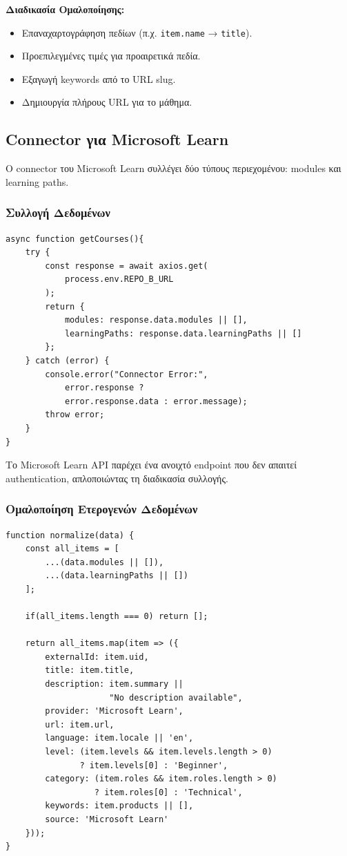 \documentclass[a4paper,12pt]{article}
\begin{document}
\textbf{Διαδικασία Ομαλοποίησης:}
\begin{itemize}
    \item Επαναχαρτογράφηση πεδίων (π.χ. \texttt{item.name} → \texttt{title}).
    \item Προεπιλεγμένες τιμές για προαιρετικά πεδία.
    \item Εξαγωγή keywords από το URL slug.
    \item Δημιουργία πλήρους URL για το μάθημα.
\end{itemize}

\subsection{Connector για Microsoft Learn}

Ο connector του Microsoft Learn συλλέγει δύο τύπους περιεχομένου: modules και learning paths.

\subsubsection{Συλλογή Δεδομένων}

\begin{verbatim}
async function getCourses(){
    try {
        const response = await axios.get(
            process.env.REPO_B_URL
        );
        return {
            modules: response.data.modules || [],
            learningPaths: response.data.learningPaths || []
        };
    } catch (error) {
        console.error("Connector Error:", 
            error.response ? 
            error.response.data : error.message);
        throw error;
    }
}
\end{verbatim}

Το Microsoft Learn API παρέχει ένα ανοιχτό endpoint που δεν απαιτεί authentication, απλοποιώντας τη διαδικασία συλλογής.

\subsubsection{Ομαλοποίηση Ετερογενών Δεδομένων}

\begin{verbatim}
function normalize(data) {
    const all_items = [
        ...(data.modules || []), 
        ...(data.learningPaths || [])
    ];
    
    if(all_items.length === 0) return [];
    
    return all_items.map(item => ({
        externalId: item.uid,
        title: item.title,
        description: item.summary || 
                     "No description available",
        provider: 'Microsoft Learn',
        url: item.url,
        language: item.locale || 'en',
        level: (item.levels && item.levels.length > 0) 
               ? item.levels[0] : 'Beginner',
        category: (item.roles && item.roles.length > 0) 
                  ? item.roles[0] : 'Technical',
        keywords: item.products || [],
        source: 'Microsoft Learn'
    }));
}
\end{verbatim}
\end{document}
